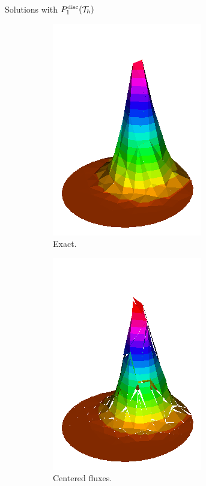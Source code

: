 		\begin{frame}{Solutions with $\relax{P}^{\text{disc}}_1(\mathcal{T}_h)$}
		\begin{figure}[h!]
			\vspace*{-0.2cm}
			\begin{subfigure}[b]{0.27\textwidth}
				\centering
				\includegraphics[scale=0.18]{img/Conveccion_Reaccion/Recortes/steady_convect_react_exact_n_32.png}
				\caption{Exact.}
			\end{subfigure}
			\begin{subfigure}[b]{0.27\textwidth}
				\centering
				\includegraphics[scale=0.18]{img/Conveccion_Reaccion/Recortes/steady_convect_react_approx_CF_n_32.png}
				\caption{Centered fluxes.}
			\end{subfigure}
			\begin{subfigure}[b]{0.27\textwidth}

\end{subfigure}
\end{figure}
\end{frame}
